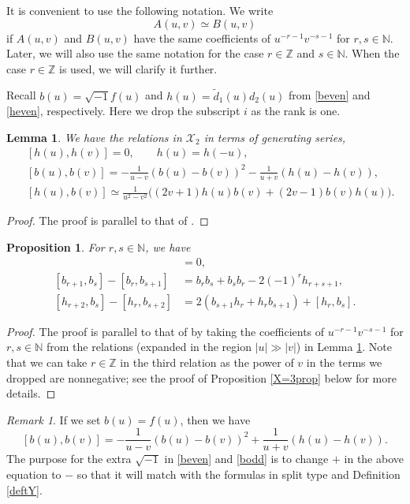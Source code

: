 \documentclass[11pt,reqno]{amsart}
\numberwithin{equation}{section}
\newtheorem{prop}[thm]{Proposition}
\newtheorem{lem}[thm]{Lemma}
\theoremstyle{definition}
\theoremstyle{remark}
\newtheorem{rem}[thm]{Remark}
\newcommand{\beq}{\begin{equation}}
\newcommand{\eeq}{\end{equation}}
\newcommand{\bZ}{\mathbb{Z}}
\newcommand{\bN}{\mathbb{N}}
\newcommand{\tl}{\tilde}
\newcommand{\scrX}{{\mathscr{X}}}
\begin{document}
It is convenient to use the following notation. We write
\beq\label{simdef}
A(u,v)\simeq B(u,v)
\eeq
if $A(u,v)$ and $B(u,v)$ have the same coefficients of $u^{-r-1}v^{-s-1}$ for $r,s\in\bN$. Later, we will also use the same notation for the case $r\in \bZ$ and $s\in\bN$. When the case $r\in\bZ$ is used, we will clarify it further.

Recall $b(u)=\sqrt{-1}f(u)$ and $h(u)=\tl d_1(u)d_2(u)$ from \eqref{beven} and \eqref{heven}, respectively. Here we drop the subscript $i$ as the rank is one. 

\begin{lem}\label{b2s}
We have the relations in $\scrX_2$ in terms of generating series,
\begin{align*}
&[h(u),h(v)]=0,\qquad h(u)=h(-u),\\
&[b(u),b(v)]=-\frac{1}{u-v}(b(u)-b(v))^2-\frac{1}{u+v}(h(u)-h(v)),\\\
&[h(u),b(v)]\simeq\frac{1}{u^2-v^2}\big((2v+1)h(u)b(v)+(2v-1)b(v)h(u)\big).
\end{align*}
\end{lem}
\begin{proof}
The proof is parallel to that of \cite[Lem. 4.2]{KLWZ23a}.
\end{proof}

\begin{prop}\label{X=2}
For $r,s\in\bN$, we have
\begin{align*}
[h_r,h_s] &=0,\\
[b_{r+1},b_s]-[b_r,b_{s+1}] &=b_rb_s+b_sb_r-2(-1)^rh_{r+s+1},\\
[h_{r+2},b_s]-[h_r,b_{s+2}] &=2(b_{s+1}h_r+h_rb_{s+1})+[h_r,b_s].
\end{align*}
\end{prop}

\begin{proof}
The proof is parallel to that of  \cite[Prop. 4.3]{KLWZ23a} by taking the coefficients of $u^{-r-1}v^{-s-1}$ for $r,s\in\bN$ from the relations (expanded in the region $|u|\gg |v|$) in Lemma \ref{b2s}. Note that we can take $r\in \bZ$ in the third relation as the power of $v$ in the terms we dropped are nonnegative; see the proof of Proposition \ref{X=3prop} below for more details.
\end{proof}
\begin{rem}
If we set $b(u)=f(u)$, then we have
\[
[b(u),b(v)]=-\frac{1}{u-v}(b(u)-b(v))^2+\frac{1}{u+v}(h(u)-h(v)).
\]
The purpose for the extra $\sqrt{-1}$ in \eqref{beven} and \eqref{bodd} is to change $+$ in the above equation to $-$ so that it will match with the formulas in split type \cite{KLWZ23a,KLWZ23b} and Definition \ref{deftY}.
\end{rem}
\end{document}
